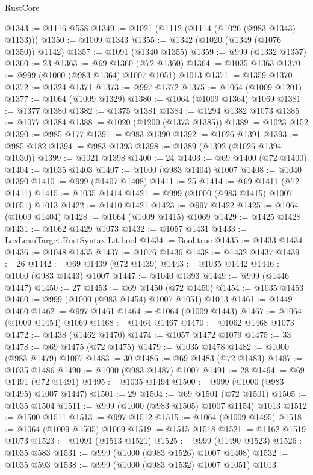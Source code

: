 \begin{lexlean}{RustCore}
\begin{coremodule}
@1343 := @1116 @558
@1349 := @1021 (@1112 (@1114 (@1026 (@983 @1343) @1133)))
@1350 := @1009 @1343
@1355 := @1342 (@1020 (@1349 (@1076 @1350)) @1142)
@1357 := @1091 (@1340 @1355)
@1359 := @999 (@1332 @1357)
@1360 := 23
@1363 := @69 @1360 (@72 @1360)
@1364 := @1035 @1363
@1370 := @999 (@1000 (@983 @1364) @1007 @1051) @1013
@1371 := @1359 @1370
@1372 := @1324 @1371
@1373 := @997 @1372
@1375 := @1064 (@1009 @1201)
@1377 := @1064 (@1009 @1329)
@1380 := @1064 (@1009 @1364) @1069
@1381 := @1377 @1380
@1382 := @1375 @1381
@1384 := @1294 @1382 @1073
@1385 := @1077 @1384
@1388 := @1020 (@1200 (@1373 @1385))
@1389 := @1023 @152
@1390 := @985 @177
@1391 := @983 @1390
@1392 := @1026 @1391
@1393 := @985 @182
@1394 := @983 @1393
@1398 := @1389 (@1392 (@1026 @1394 @1030))
@1399 := @1021 @1398
@1400 := 24
@1403 := @69 @1400 (@72 @1400)
@1404 := @1035 @1403
@1407 := @1000 (@983 @1404) @1007
@1408 := @1040 @1390
@1410 := @999 (@1407 @1408)
@1411 := 25
@1414 := @69 @1411 (@72 @1411)
@1415 := @1035 @1414
@1421 := @999 (@1000 (@983 @1415) @1007 @1051) @1013
@1422 := @1410 @1421
@1423 := @997 @1422
@1425 := @1064 (@1009 @1404)
@1428 := @1064 (@1009 @1415) @1069
@1429 := @1425 @1428
@1431 := @1062 @1429 @1073
@1432 := @1057 @1431
@1433 := LexLeanTarget.RustSyntax.Lit.bool
@1434 := Bool.true
@1435 := @1433 @1434
@1436 := @1048 @1435
@1437 := @1076 @1436
@1438 := @1432 @1437
@1439 := 26
@1442 := @69 @1439 (@72 @1439)
@1443 := @1035 @1442
@1446 := @1000 (@983 @1443) @1007
@1447 := @1040 @1393
@1449 := @999 (@1446 @1447)
@1450 := 27
@1453 := @69 @1450 (@72 @1450)
@1454 := @1035 @1453
@1460 := @999 (@1000 (@983 @1454) @1007 @1051) @1013
@1461 := @1449 @1460
@1462 := @997 @1461
@1464 := @1064 (@1009 @1443)
@1467 := @1064 (@1009 @1454) @1069
@1468 := @1464 @1467
@1470 := @1062 @1468 @1073
@1472 := @1438 (@1462 @1470)
@1474 := @1057 @1472 @1079
@1475 := 33
@1478 := @69 @1475 (@72 @1475)
@1479 := @1035 @1478
@1482 := @1000 (@983 @1479) @1007
@1483 := 30
@1486 := @69 @1483 (@72 @1483)
@1487 := @1035 @1486
@1490 := @1000 (@983 @1487) @1007
@1491 := 28
@1494 := @69 @1491 (@72 @1491)
@1495 := @1035 @1494
@1500 := @999 (@1000 (@983 @1495) @1007 @1447)
@1501 := 29
@1504 := @69 @1501 (@72 @1501)
@1505 := @1035 @1504
@1511 := @999 (@1000 (@983 @1505) @1007 @1154) @1013
@1512 := @1500 @1511
@1513 := @997 @1512
@1515 := @1064 (@1009 @1495)
@1518 := @1064 (@1009 @1505) @1069
@1519 := @1515 @1518
@1521 := @1162 @1519 @1073
@1523 := @1091 (@1513 @1521)
@1525 := @999 (@1490 @1523)
@1526 := @1035 @583
@1531 := @999 (@1000 (@983 @1526) @1007 @1408)
@1532 := @1035 @593
@1538 := @999 (@1000 (@983 @1532) @1007 @1051) @1013

\end{coremodule}
\end{lexlean}
